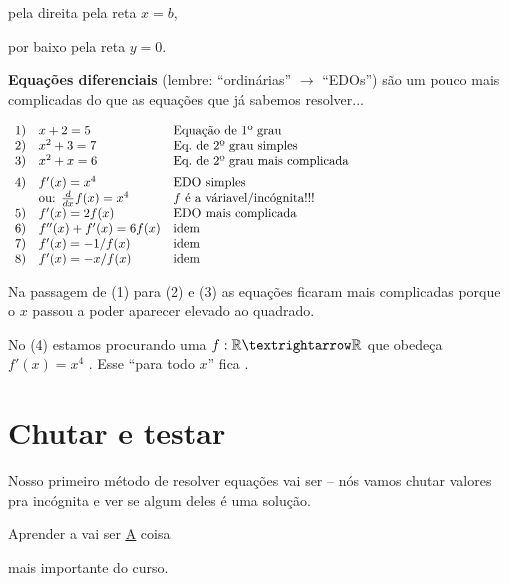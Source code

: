 \documentclass[oneside,12pt]{article}
\begin{document}
pela direita pela reta $x=b$,

por baixo pela reta $y=0$.

\newpage

{\bf Equações diferenciais} (lembre: ``ordinárias'' $→$ ``EDOs'') são
um pouco mais complicadas do que as equações que já sabemos
resolver...

\def\te{\text}

\msk

$\scalebox{0.90}{$
\begin{array}{rll}
 1) & x+2   = 5                   & \te{Equação de 1º grau} \\
 2) & x^2+3 = 7                   & \te{Eq.\ de 2º grau simples} \\
 3) & x^2+x = 6                   & \te{Eq.\ de 2º grau mais complicada} \\[5pt]
 4) & f'(x) = x^4                 & \te{EDO simples} \\
    & \text{ou: } \ddx f(x) = x^4 & \te{$f$ é a váriavel/incógnita!!!} \\
 5) & f'(x) = 2f(x)               & \te{EDO mais complicada} \\
 6) & f''(x) + f'(x) = 6f(x)      & \te{idem} \\
 7) & f'(x) = -1/f(x)             & \te{idem} \\
 8) & f'(x) = -x/f(x)             & \te{idem} \\
 \end{array}
 $}
$

\msk

Na passagem de (1) para (2) e (3) as equações ficaram mais complicadas
porque o $x$ passou a poder aparecer elevado ao quadrado.

No (4) estamos procurando uma  $f:\R→\R$ que obedeça
$f'(x) = x^4$ . Esse ``para todo $x$'' fica
.

\newpage

\section{Chutar e testar}

Nosso primeiro método de resolver equações vai ser  -- nós vamos chutar valores pra incógnita e ver se algum
deles é uma solução.

\begin{center}

\bf\Large

Aprender a  vai ser
\underline{\underline{\underline{A}}} coisa

mais importante do curso.

\end{center}
\end{document}
